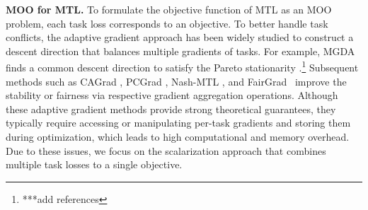 \documentclass[sigconf]{acmart}
\begin{document}

\noindent \textbf{MOO for MTL.} 
To formulate the objective function of MTL as an MOO problem, each task loss corresponds to an objective. To better handle task conflicts, the adaptive gradient approach has been widely studied to construct a descent direction that balances multiple gradients of tasks. For example, MGDA \cite{sener2018multi} finds a common descent direction to satisfy the Pareto stationarity \citep{desideri2012multiple}.\footnote{***add references } Subsequent methods such as CAGrad \cite{liu2021conflict}, PCGrad \cite{yu2020gradient}, Nash-MTL \cite{navon2022multi}, and FairGrad~\cite{ban2024fair} improve the stability or fairness via respective gradient aggregation operations. Although these adaptive gradient methods provide strong theoretical guarantees, they typically require accessing or manipulating per-task gradients and storing them during optimization, which leads to high computational and memory overhead. 
Due to these issues, we focus on the scalarization approach that combines multiple task losses to a single objective.
\end{document}
